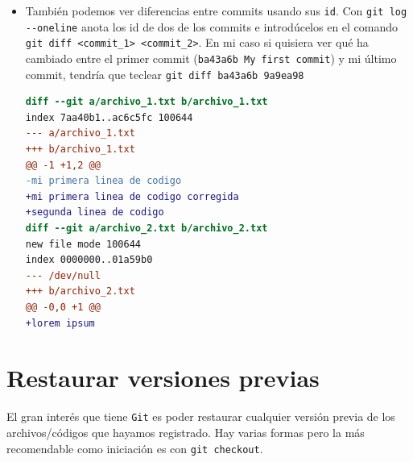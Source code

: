 \documentclass[a4paper,11pt]{report}
\newcommand{\cverb}{\Verb}
\begin{document}
\begin{enumerate}
\begin{itemize}
      \item También podemos ver diferencias entre commits usando sus \verb+id+. Con \cverb+git log --oneline+ anota los id de dos de los commits e introdúcelos en el comando \cverb+git diff <commit_1> <commit_2>+. En mi caso si quisiera ver qué ha cambiado entre el primer commit (\verb+ba43a6b My first commit+) y mi último commit, tendría que teclear \cverb+git diff ba43a6b 9a9ea98+
      
      \begin{lstlisting}[language=diff]
diff --git a/archivo_1.txt b/archivo_1.txt
index 7aa40b1..ac6c5fc 100644
--- a/archivo_1.txt
+++ b/archivo_1.txt
@@ -1 +1,2 @@
-mi primera linea de codigo
+mi primera linea de codigo corregida
+segunda linea de codigo
diff --git a/archivo_2.txt b/archivo_2.txt
new file mode 100644
index 0000000..01a59b0
--- /dev/null
+++ b/archivo_2.txt
@@ -0,0 +1 @@
+lorem ipsum
      \end{lstlisting}
      
    \end{itemize}
    \end{enumerate}

  \section{Restaurar versiones previas}
    El gran interés que tiene \verb+Git+ es poder restaurar cualquier versión previa de los archivos/códigos que hayamos registrado. Hay varias formas pero la más recomendable como iniciación es con \verb+git checkout+.
    
\end{document}
